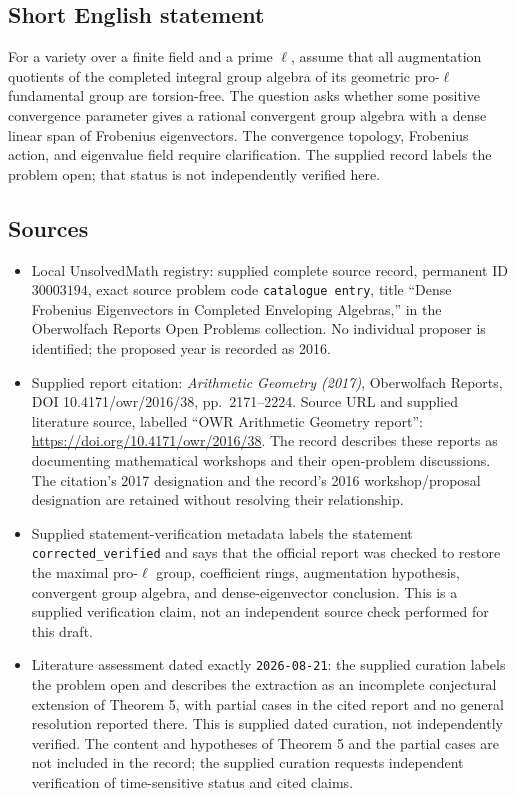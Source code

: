 \documentclass[11pt]{article}
\begin{document}
\subsection{Short English statement}
For a variety over a finite field and a prime \(\ell\), assume that all augmentation quotients of the completed integral group algebra of its geometric pro-\(\ell\) fundamental group are torsion-free. The question asks whether some positive convergence parameter gives a rational convergent group algebra with a dense linear span of Frobenius eigenvectors. The convergence topology, Frobenius action, and eigenvalue field require clarification. The supplied record labels the problem open; that status is not independently verified here.
\subsection{Sources}
\begin{itemize}
\item Local UnsolvedMath registry: supplied complete source record, permanent ID \(30003194\), exact source problem code \texttt{catalogue entry}, title ``Dense Frobenius Eigenvectors in Completed Enveloping Algebras,'' in the Oberwolfach Reports Open Problems collection. No individual proposer is identified; the proposed year is recorded as 2016.
\item Supplied report citation: \emph{Arithmetic Geometry (2017)}, Oberwolfach Reports, DOI 10.4171/owr/2016/38, pp.\ 2171--2224. Source URL and supplied literature source, labelled ``OWR Arithmetic Geometry report'': \url{https://doi.org/10.4171/owr/2016/38}. The record describes these reports as documenting mathematical workshops and their open-problem discussions. The citation's 2017 designation and the record's 2016 workshop/proposal designation are retained without resolving their relationship.
\item Supplied statement-verification metadata labels the statement \texttt{corrected\_verified} and says that the official report was checked to restore the maximal pro-\(\ell\) group, coefficient rings, augmentation hypothesis, convergent group algebra, and dense-eigenvector conclusion. This is a supplied verification claim, not an independent source check performed for this draft.
\item Literature assessment dated exactly \texttt{2026-08-21}: the supplied curation labels the problem open and describes the extraction as an incomplete conjectural extension of Theorem 5, with partial cases in the cited report and no general resolution reported there. This is supplied dated curation, not independently verified. The content and hypotheses of Theorem 5 and the partial cases are not included in the record; the supplied curation requests independent verification of time-sensitive status and cited claims.
\end{itemize}
\end{document}
